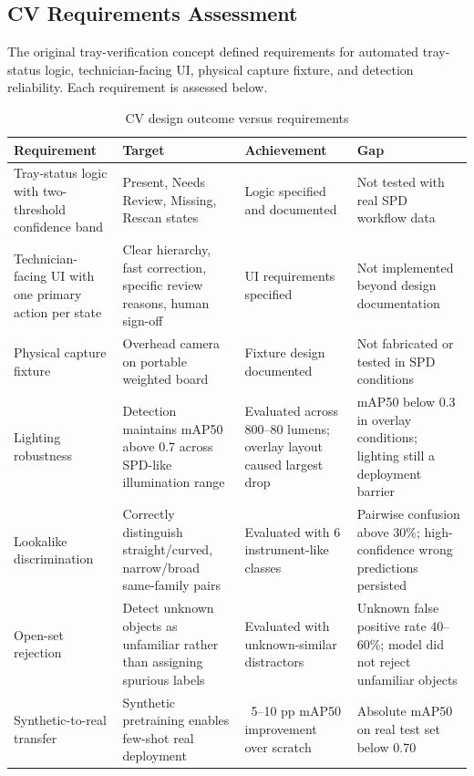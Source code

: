 \documentclass[10pt,a4paper]{article}
\begin{document}
\subsection{CV Requirements Assessment}
\label{sec:cv-requirements-assessment}

The original tray-verification concept defined requirements for automated
tray-status logic, technician-facing UI, physical capture fixture, and
detection reliability. Each requirement is assessed below.

\begin{table}[H]
\centering
\caption{CV design outcome versus requirements}
\label{tab:cv-design-outcome-versus-requirements}
\small\renewcommand{\arraystretch}{1.2}\setlength{\tabcolsep}{4pt}
\begin{tabularx}{\textwidth}{|>{\raggedright\arraybackslash}X|>{\raggedright\arraybackslash}X|>{\raggedright\arraybackslash}X|>{\raggedright\arraybackslash}X|}
\hline
Requirement & Target & Achievement & Gap \\
\hline
Tray-status logic with two-threshold confidence band & Present, Needs Review, Missing, Rescan states & Logic specified and documented & Not tested with real SPD workflow data \\
\hline
Technician-facing UI with one primary action per state & Clear hierarchy, fast correction, specific review reasons, human sign-off & UI requirements specified & Not implemented beyond design documentation \\
\hline
Physical capture fixture & Overhead camera on portable weighted board & Fixture design documented & Not fabricated or tested in SPD conditions \\
\hline
Lighting robustness & Detection maintains mAP50 above 0.7 across SPD-like illumination range & Evaluated across 800--80 lumens; overlay layout caused largest drop & mAP50 below 0.3 in overlay conditions; lighting still a deployment barrier \\
\hline
Lookalike discrimination & Correctly distinguish straight/curved, narrow/broad same-family pairs & Evaluated with 6 instrument-like classes & Pairwise confusion above 30\%; high-confidence wrong predictions persisted \\
\hline
Open-set rejection & Detect unknown objects as unfamiliar rather than assigning spurious labels & Evaluated with unknown-similar distractors & Unknown false positive rate 40--60\%; model did not reject unfamiliar objects \\
\hline
Synthetic-to-real transfer & Synthetic pretraining enables few-shot real deployment & ~5--10 pp mAP50 improvement over scratch & Absolute mAP50 on real test set below 0.70 \\
\hline
\end{tabularx}
\end{table}
\end{document}
